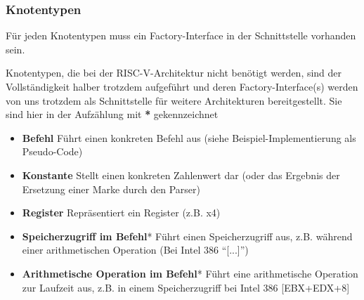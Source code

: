 \subsubsection{Knotentypen}
Für jeden Knotentypen muss ein Factory-Interface in der Schnittstelle vorhanden sein.

Knotentypen, die bei der RISC-V-Architektur nicht benötigt werden, sind der Vollständigkeit halber trotzdem aufgeführt und deren Factory-Interface(s) werden von uns trotzdem als Schnittstelle für weitere Architekturen bereitgestellt. Sie sind hier in der Aufzählung mit \textbf{*} gekennzeichnet
\begin{itemize}
	\item \textbf{Befehl} Führt einen konkreten Befehl aus (siehe Beispiel-Implementierung als Pseudo-Code)

	\item \textbf{Konstante} Stellt einen konkreten Zahlenwert dar (oder das Ergebnis der Ersetzung einer Marke durch den Parser)

	\item \textbf{Register} Repräsentiert ein Register (z.B. x4)

	\item \textbf{Speicherzugriff im Befehl}* Führt einen Speicherzugriff aus, z.B. während einer arithmetischen Operation (Bei Intel 386 ``[...]'')

	\item \textbf{Arithmetische Operation im Befehl}* Führt eine arithmetische Operation zur Laufzeit aus, z.B. in einem Speicherzugriff bei Intel 386 [EBX+EDX+8]

\end{itemize}
